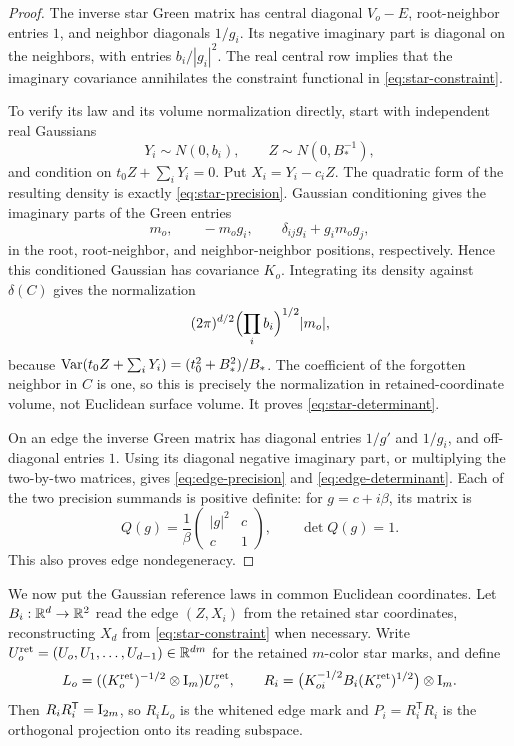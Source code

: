 \begin{proof}
The inverse star Green matrix has central diagonal \(V_o-E\),
root-neighbor entries \(1\), and neighbor diagonals \(1/g_i\).
Its negative imaginary part is diagonal on the neighbors, with
entries \(b_i/|g_i|^2\).  The real central row implies that the
imaginary covariance annihilates the constraint functional in
\eqref{eq:star-constraint}.

To verify its law and its volume normalization directly, start
with independent real Gaussians
\[
 Y_i\sim N(0,b_i),\qquad Z\sim N(0,B_*^{-1}),
\]
and condition on \(t_0Z+\sum_iY_i=0\).  Put \(X_i=Y_i-c_iZ\).
The quadratic form of the resulting density is exactly
\eqref{eq:star-precision}.  Gaussian conditioning gives the
imaginary parts of the Green entries
\[
 m_o,\qquad -m_o g_i,\qquad
 \delta_{ij}g_i+g_i m_o g_j,
\]
in the root, root-neighbor, and neighbor-neighbor positions,
respectively.  Hence this conditioned Gaussian has covariance
\(K_o\).  Integrating its density against \(\delta(C)\) gives
the normalization
\[
 (2\pi)^{d/2}\Bigl(\prod_i b_i\Bigr)^{1/2}|m_o|,
\]
because \(\operatorname{Var}(t_0Z+\sum_iY_i)=(t_0^2+B_*^2)/B_*\).
The coefficient of the forgotten neighbor in \(C\) is one, so
this is precisely the normalization in retained-coordinate
volume, not Euclidean surface volume.  It proves
\eqref{eq:star-determinant}.

On an edge the inverse Green matrix has diagonal entries
\(1/g'\) and \(1/g_i\), and off-diagonal entries \(1\).
Using its diagonal negative imaginary part, or multiplying the
two-by-two matrices, gives \eqref{eq:edge-precision} and
\eqref{eq:edge-determinant}.  Each of the two precision summands
is positive definite: for \(g=c+i\beta\), its matrix is
\begin{equation}\label{eq:one-sided-precision}
 Q(g)=\frac1\beta
 \begin{pmatrix}|g|^2&c\\c&1\end{pmatrix},
 \qquad \det Q(g)=1.
\end{equation}
This also proves edge nondegeneracy.
\end{proof}

We now put the Gaussian reference laws in common Euclidean
coordinates.  Let \(B_i:\mathbb R^d\to\mathbb R^2\) read the edge \((Z,X_i)\)
from the retained star coordinates, reconstructing \(X_d\) from
\eqref{eq:star-constraint} when necessary.  Write
\(U_o^{\rm ret}=(U_o,U_1,\ldots,U_{d-1})\in\mathbb R^{dm}\) for the
retained \(m\)-color star marks, and define
\begin{equation}\label{eq:whitened-star-edge}
 L_o=((K_o^{\rm ret})^{-1/2}\otimes\mathrm I_m)U_o^{\rm ret},
 \qquad
 R_i=\bigl(K_{oi}^{-1/2}B_i(K_o^{\rm ret})^{1/2}\bigr)\otimes\mathrm I_m.
\end{equation}
Then \(R_iR_i^{\mathsf T}=\mathrm I_{2m}\), so \(R_iL_o\) is the
whitened edge mark and \(P_i=R_i^{\mathsf T}R_i\) is the
orthogonal projection onto its reading subspace.

